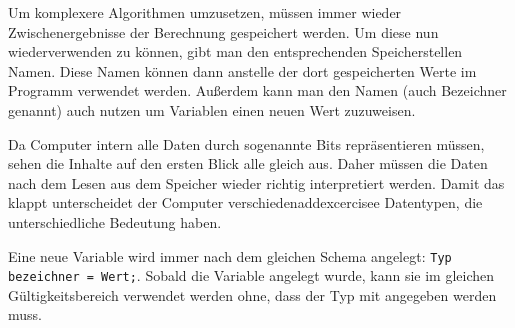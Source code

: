 

Um komplexere Algorithmen umzusetzen, müssen immer wieder Zwischenergebnisse der Berechnung gespeichert werden.
Um diese nun wiederverwenden zu können, gibt man den entsprechenden Speicherstellen Namen.
Diese Namen können dann anstelle der dort gespeicherten Werte im Programm verwendet werden.
Außerdem kann man den Namen (auch Bezeichner genannt) auch nutzen um Variablen einen neuen Wert zuzuweisen.

Da Computer intern alle Daten durch sogenannte Bits repräsentieren müssen, sehen die Inhalte auf den ersten Blick alle gleich aus.
Daher müssen die Daten nach dem Lesen aus dem Speicher wieder richtig interpretiert werden.
Damit das klappt unterscheidet der Computer verschiedenaddexcercisee Datentypen, die unterschiedliche Bedeutung haben.

Eine neue Variable wird immer nach dem gleichen Schema angelegt: \lstinline|Typ bezeichner = Wert;|.
Sobald die Variable angelegt wurde, kann sie im gleichen Gültigkeitsbereich verwendet werden ohne, dass der Typ mit angegeben werden muss.


